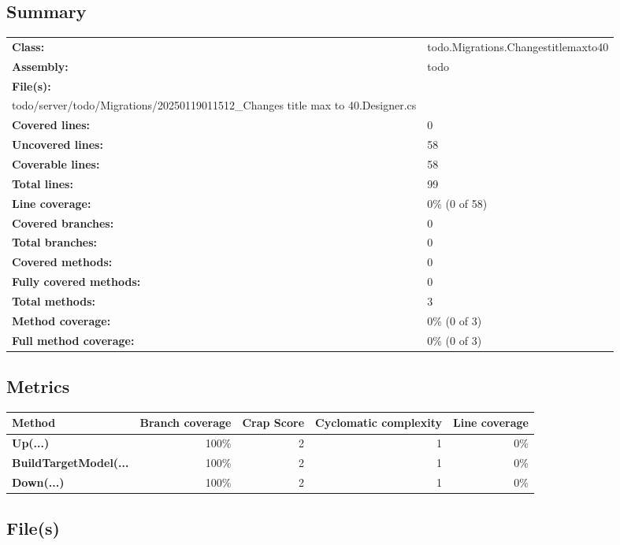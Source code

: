 \documentclass[a4paper,landscape,10pt]{article}
\begin{document}
\subsection{Summary}
\begin{longtable}[l]{ll}
\textbf{Class:} & todo.Migrations.Changestitlemaxto40\\
\textbf{Assembly:} & todo\\
\textbf{File(s):} & \begin{minipage}[t]{12cm}{cts/4-Cs/todo/server/todo/Migrations/20250119011512\_Changes title max to 40.cs\\todo/server/todo/Migrations/20250119011512\_Changes title max to 40.Designer.cs}\end{minipage} \\
\textbf{Covered lines:} & 0\\
\textbf{Uncovered lines:} & 58\\
\textbf{Coverable lines:} & 58\\
\textbf{Total lines:} & 99\\
\textbf{Line coverage:} & 0\% (0 of 58)\\
\textbf{Covered branches:} & 0\\
\textbf{Total branches:} & 0\\
\textbf{Covered methods:} & 0\\
\textbf{Fully covered methods:} & 0\\
\textbf{Total methods:} & 3\\
\textbf{Method coverage:} & 0\% (0 of 3)\\
\textbf{Full method coverage:} & 0\% (0 of 3)\\
\end{longtable}
\subsection{Metrics}
\begin{longtable}[l]{|l|r|r|r|r|}
\hline
\textbf{Method} & \textbf{Branch coverage} & \textbf{Crap Score} & \textbf{Cyclomatic complexity} & \textbf{Line coverage}\\
\hline
\textbf{Up(...)} & 100\% & 2 & 1 & 0\%\\
\hline
\textbf{BuildTargetModel(...} & 100\% & 2 & 1 & 0\%\\
\hline
\textbf{Down(...)} & 100\% & 2 & 1 & 0\%\\
\hline
\end{longtable}
\subsection{File(s)}
\end{document}
